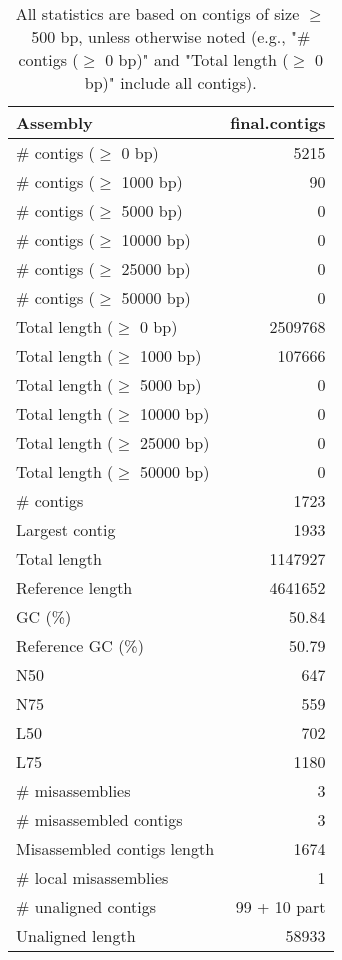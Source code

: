\documentclass[12pt,a4paper]{article}
\begin{document}
\begin{table}[ht]
\begin{center}
\caption{All statistics are based on contigs of size $\geq$ 500 bp, unless otherwise noted (e.g., "\# contigs ($\geq$ 0 bp)" and "Total length ($\geq$ 0 bp)" include all contigs).}
\begin{tabular}{|l*{1}{|r}|}
\hline
Assembly & final.contigs \\ \hline
\# contigs ($\geq$ 0 bp) & 5215 \\ \hline
\# contigs ($\geq$ 1000 bp) & 90 \\ \hline
\# contigs ($\geq$ 5000 bp) & 0 \\ \hline
\# contigs ($\geq$ 10000 bp) & 0 \\ \hline
\# contigs ($\geq$ 25000 bp) & 0 \\ \hline
\# contigs ($\geq$ 50000 bp) & 0 \\ \hline
Total length ($\geq$ 0 bp) & 2509768 \\ \hline
Total length ($\geq$ 1000 bp) & 107666 \\ \hline
Total length ($\geq$ 5000 bp) & 0 \\ \hline
Total length ($\geq$ 10000 bp) & 0 \\ \hline
Total length ($\geq$ 25000 bp) & 0 \\ \hline
Total length ($\geq$ 50000 bp) & 0 \\ \hline
\# contigs & 1723 \\ \hline
Largest contig & 1933 \\ \hline
Total length & 1147927 \\ \hline
Reference length & 4641652 \\ \hline
GC (\%) & 50.84 \\ \hline
Reference GC (\%) & 50.79 \\ \hline
N50 & 647 \\ \hline
N75 & 559 \\ \hline
L50 & 702 \\ \hline
L75 & 1180 \\ \hline
\# misassemblies & 3 \\ \hline
\# misassembled contigs & 3 \\ \hline
Misassembled contigs length & 1674 \\ \hline
\# local misassemblies & 1 \\ \hline
\# unaligned contigs & 99 + 10 part \\ \hline
Unaligned length & 58933 \\ \hline

\end{tabular}
\end{center}
\end{table}
\end{document}
